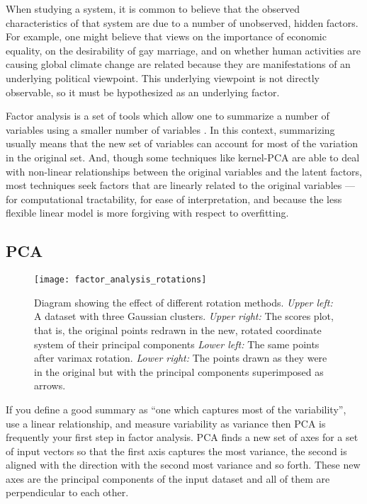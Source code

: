 When studying a system, it is common to believe that the observed
characteristics of that system are due to a number of unobserved, hidden 
factors. For example, one might believe that views on the importance of
economic equality, on the desirability of gay marriage, and on whether human
activities are causing global climate change are related because they are 
manifestations of an underlying political viewpoint. This underlying viewpoint
is not directly observable, so it must be hypothesized as an underlying factor.

Factor analysis is a set of tools which allow one to summarize a number of
variables using a smaller number of variables \citep{Bartholomew2011}. In this 
context, summarizing usually means that the new set of variables can account 
for most of the variation in the original set. And, though some techniques like
kernel-PCA are able to deal with non-linear relationships between the original
variables and the latent factors, most techniques seek factors that are
linearly related to the original variables --- for computational 
tractability, for ease of interpretation, and because the less flexible linear
model is more forgiving with respect to overfitting.

\subsection{PCA}

\begin{figure}[tbp]
    \texttt{[image: factor\_analysis\_rotations]}
    \caption{Diagram showing the effect of different rotation methods. 
    \textit{Upper left:} A dataset with three Gaussian clusters. 
    \textit{Upper right:} The scores plot, that is, the original points 
    redrawn in the new, rotated coordinate system of their principal 
    components \textit{Lower left:} The same points after varimax rotation. 
    \textit{Lower right:} The points drawn as they were
    in the original but with the principal components superimposed as arrows.}
    \label{fig:pcarotation}
\end{figure}

If you define a good summary as ``one which captures most of the variability'',
use a linear relationship, and measure variability as
variance then PCA is frequently your first step in factor analysis.
PCA finds a new set of axes for a set of input vectors so that the first
axis captures the most variance, the second is aligned with the direction with 
the second most variance and so forth. These new axes are the principal 
components of the input dataset and all of them are perpendicular to each other.

